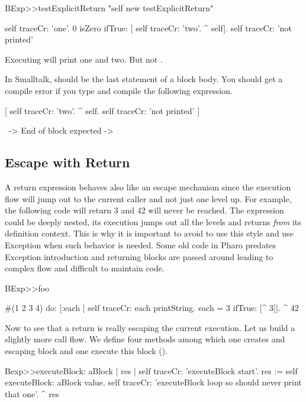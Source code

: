 \documentclass[a4paper,10pt,twoside]{book}
\begin{document}
\begin{code}{}
BExp>>testExplicitReturn
	"self new testExplicitReturn"
	
	self traceCr: 'one'.
	0 isZero ifTrue: [ self traceCr: 'two'. ^ self].
	self traceCr: 'not printed'
\end{code}

Executing  will print one and two. But not .

In Smalltalk, \ct{^} should be the last statement of a block body. You should get a compile error if you type and compile the following expression. 

\begin{code}{}
[ self traceCr: 'two'.
  ^ self.  
  self traceCr: 'not printed' ]
  
    ~-> End of block expected ->
\end{code}


\subsection{Escape with Return}
A return expression behaves also like an escape mechanism since the execution flow will jump out to the current caller and not just one level up. For example, the following code will return 3 and 42 will never be reached. The expression \ct{[ ^3 ]} could be deeply nested, its execution jumps out all the levels and returns \emph{from} its definition context. This is why it is important to avoid to use this style and use Exception when such behavior is needed. Some old code in Pharo predates Exception introduction and returning blocks are passed around leading to complex flow and difficult to maintain code. 

\begin{code}{}
BExp>>foo
	
	#(1 2 3 4) do: [:each | 
					self traceCr: each printString. 
					each = 3 
						ifTrue: [^ 3]].						
	^ 42
\end{code}

Now to see that a return is really escaping the current execution. Let us build a slightly more call flow. 
We define four methods among which one creates and escaping block  and one execute this block ().


\begin{code}{}
Bexp>>executeBlock: aBlock
	| res |
	self traceCr: 'executeBlock start'.
	res := self executeBlock: aBlock value. 
	self traceCr: 'executeBlock loop so should never print that one'.
	^  res
\end{code}
\end{document}
